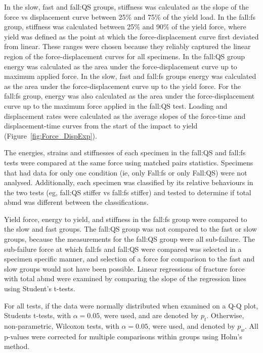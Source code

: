 In the slow, fast and fall:\ac{QS} groups, stiffness was calculated as the slope of the force \ac{vs} displacement curve between 25\% and 75\% of the yield load.
In the fall:\ac{fs} group, stiffness was calculated between 25\% and 90\% of the yield force, where yield was defined as the point at which the force-displacement curve first deviated from linear.
These ranges were chosen because they reliably captured the linear region of the force-displacement curves for all specimens.
In the fall:\ac{QS} group energy was calculated as the area under the force-displacement curve up to maximum applied force.
In the slow, fast and fall:\ac{fs} groups energy was calculated as the area under the force-displacement curve up to the yield force.
For the fall:\ac{fs} group, energy was also calculated as the area under the force-displacement curve up to the maximum force applied in the fall:\ac{QS} test.
Loading and displacement rates were calculated as the average slopes of the force-time and displacement-time curves from the start of the impact to yield (Figure~\ref{fig:Force_DispExp}).

The energies, strains and stiffnesses of each specimen in the fall:\ac{QS} and fall:\ac{fs} tests were compared at the same force using matched pairs statistics.
Specimens that had data for only one condition (\ac{ie}, only Fall:\ac{fs} or only Fall:\ac{QS}) were not analysed.
Additionally, each specimen was classified by its relative behaviours in the two tests (\ac{eg}, fall:\ac{QS} stiffer \ac{vs} fall:\ac{fs} stiffer) and tested to determine if total \ac{abmd} was different between the classifications.

Yield force, energy to yield, and stiffness in the fall:\ac{fs} group were compared to the slow and fast groups.
The fall:\ac{QS} group was not compared to the fast or slow groups, because the measurements for the fall:\ac{QS} group were all sub-failure.
The sub-failure force at which fall:\ac{fs} and fall:\ac{QS} were compared was selected in a specimen specific manner, and selection of a force for comparison to the fast and slow groups would not have been possible.
Linear regressions of fracture force with total \ac{abmd} were examined by comparing the slope of the regression lines using Student's t-tests.

For all tests, if the data were normally distributed when examined on a Q-Q plot, Students t-tests, with $\alpha = 0.05$, were used, and are denoted by $p_t$. Otherwise, non-parametric, Wilcoxon tests, with $\alpha = 0.05$, were used, and denoted by $p_w$. All p-values were corrected for multiple comparisons within groups using Holm's method.

